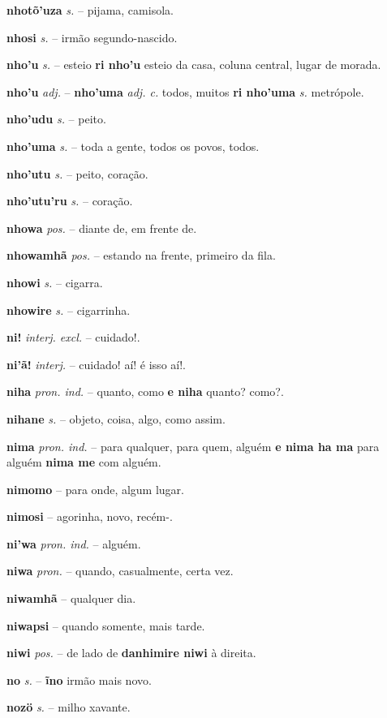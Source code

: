 \textbf{nhotõ'uza} \textit{s.} -- pijama, camisola.

\textbf{nhosi} \textit{s.} -- irmão segundo-nascido.

\textbf{nho'u} \textit{s.} -- esteio  \textbf{ri nho'u} esteio da casa, coluna central, lugar de morada.

\textbf{nho'u} \textit{adj.} -- \textbf{nho'uma} \textit{adj. c.} todos, muitos  \textbf{ri nho'uma} \textit{s.} metrópole.

\textbf{nho'udu} \textit{s.} -- peito.

\textbf{nho'uma} \textit{s.} -- toda a gente, todos os povos, todos.

\textbf{nho'utu} \textit{s.} -- peito, coração.

\textbf{nho'utu'ru} \textit{s.} -- coração.

\textbf{nhowa} \textit{pos.} -- diante de, em frente de.

\textbf{nhowamhã} \textit{pos.} -- estando na frente, primeiro da fila.

\textbf{nhowi} \textit{s.} -- cigarra.

\textbf{nhowire} \textit{s.} -- cigarrinha.

\textbf{ni!} \textit{interj. excl.} -- cuidado!.

\textbf{ni'ã!} \textit{interj.} -- cuidado! aí! é isso aí!.

\textbf{niha} \textit{pron. ind.} -- quanto, como  \textbf{e niha} quanto? como?.

\textbf{nihane} \textit{s.} -- objeto, coisa, algo, como assim.

\textbf{nima} \textit{pron. ind.} -- para qualquer, para quem, alguém  \textbf{e nima ha ma} para alguém  \textbf{nima me} com alguém.

\textbf{nimomo} -- para onde, algum lugar.

\textbf{nimosi} -- agorinha, novo, recém-.

\textbf{ni'wa} \textit{pron. ind.} -- alguém.

\textbf{niwa} \textit{pron.} -- quando, casualmente, certa vez.

\textbf{niwamhã} -- qualquer dia.

\textbf{niwapsi} -- quando somente, mais tarde.

\textbf{niwi} \textit{pos.} -- de lado de  \textbf{danhimire niwi} à direita.

\textbf{no} \textit{s.} -- \textbf{ĩno} irmão mais novo.

\textbf{nozö} \textit{s.} -- milho xavante.

